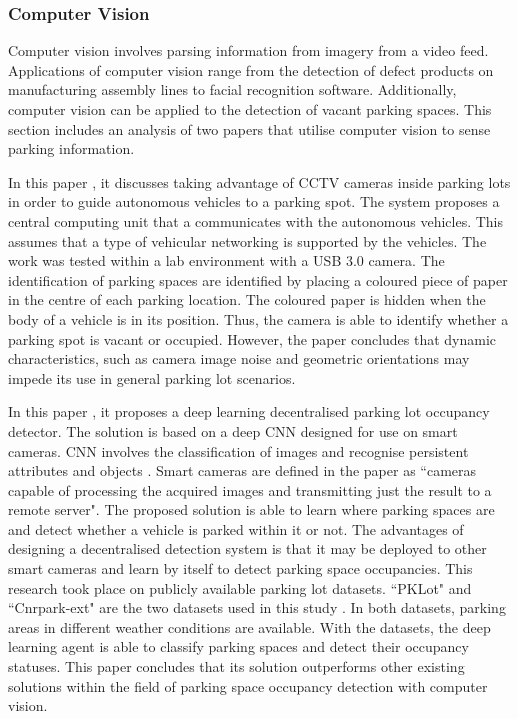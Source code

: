 \subsubsection*{Computer Vision}
Computer vision involves parsing information from imagery from a video feed. Applications of computer vision range from the detection of defect products on manufacturing assembly lines to facial recognition software. Additionally, computer vision can be applied to the detection of vacant parking spaces. This section includes an analysis of two papers that utilise computer vision to sense parking information.

In this paper \citep{cho_automatic_2016}, it discusses taking advantage of CCTV cameras inside parking lots in order to guide autonomous vehicles to a parking spot. The system proposes a central computing unit that a communicates with the autonomous vehicles. This assumes that a type of vehicular networking is supported by the vehicles. The work was tested within a lab environment with a USB 3.0 camera. The identification of parking spaces are identified by placing a coloured piece of paper in the centre of each parking location. The coloured paper is hidden when the body of a vehicle is in its position. Thus, the camera is able to  identify whether a parking spot is vacant or occupied. However, the paper concludes that dynamic characteristics, such as camera image noise and geometric orientations may impede its use in general parking lot scenarios.

In this paper \citep{amato_deep_2017}, it proposes a deep learning decentralised parking lot occupancy detector. The solution is based on a deep \ac{CNN} designed for use on smart cameras. \ac{CNN} involves the classification of images and recognise persistent attributes and objects \citep{Krizhevsky2012ImageNetNetworks}. Smart cameras are defined in the paper as ``cameras capable of processing the acquired images and transmitting just the result to a remote server". The proposed solution is able to learn where parking spaces are and detect whether a vehicle is parked within it or not. The advantages of designing a decentralised detection system is that it may be deployed to other smart cameras and learn by itself to detect parking space occupancies. This research took place on publicly available parking lot datasets. ``PKLot" and ``Cnrpark-ext" are the two datasets used in this study \citep{2017PKLot, 2017CNR-EXT}. In both datasets, parking areas in different weather conditions are available. With the datasets, the deep learning agent is able to classify parking spaces and detect their occupancy statuses. This paper concludes that its solution outperforms other existing solutions within the field of parking space occupancy detection with computer vision.


